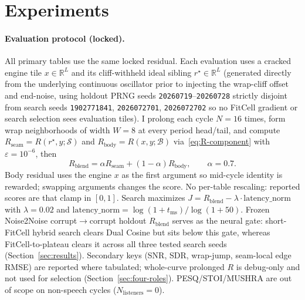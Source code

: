 \section{Experiments}
\label{sec:experiments}

\paragraph{Evaluation protocol (locked).}
\label{sec:eval-protocol}
All primary tables use the same locked residual.
Each evaluation uses a cracked engine tile $x\in\mathbb{R}^{L}$ and its cliff-withheld ideal sibling $r^{\star}\in\mathbb{R}^{L}$ (generated directly from the underlying continuous oscillator prior to injecting the wrap-cliff offset and end-noise, using holdout PRNG seeds \texttt{20260719}--\texttt{20260728} strictly disjoint from search seeds \texttt{1902771841}, \texttt{2026072701}, \texttt{2026072702} so no FitCell gradient or search selection sees evaluation tiles).
I prolong each cycle $N{=}16$ times, form wrap neighborhoods of width $W{=}8$ at every period head/tail,
and compute $R_{\mathrm{seam}}=R(r^{\star},y;\mathcal{S})$ and $R_{\mathrm{body}}=R(x,y;\mathcal{B})$ via~\eqref{eq:R-component} with $\varepsilon=10^{-6}$, then
\[
R_{\mathrm{blend}}=\alpha R_{\mathrm{seam}}+(1-\alpha)R_{\mathrm{body}},\qquad\alpha{=}0.7.
\]
Body residual uses the engine $x$ as the first argument so mid-cycle identity is rewarded; swapping arguments changes the score.
No per-table rescaling: reported scores are that clamp in $[0,1]$.
Search maximizes
$J=R_{\mathrm{blend}}-\lambda\cdot\mathrm{latency\_norm}$ with $\lambda{=}0.02$ and
$\mathrm{latency\_norm}=\log(1{+}t_{\mathrm{ms}})/\log(1{+}50)$.
Frozen Noise2Noise corrupt$\to$corrupt holdout $R_{\mathrm{blend}}$ serves as the neural gate: short-FitCell hybrid search clears Dual Cosine but sits below this gate, whereas FitCell-to-plateau clears it across all three tested search seeds (Section~\ref{sec:results}).
Secondary keys (SNR, SDR, wrap-jump, seam-local edge RMSE) are reported where tabulated;
whole-curve prolonged $R$ is debug-only and not used for selection (Section~\ref{sec:four-roles}).
PESQ/STOI/MUSHRA are out of scope on non-speech cycles ($N_{\mathrm{listeners}}{=}0$).


